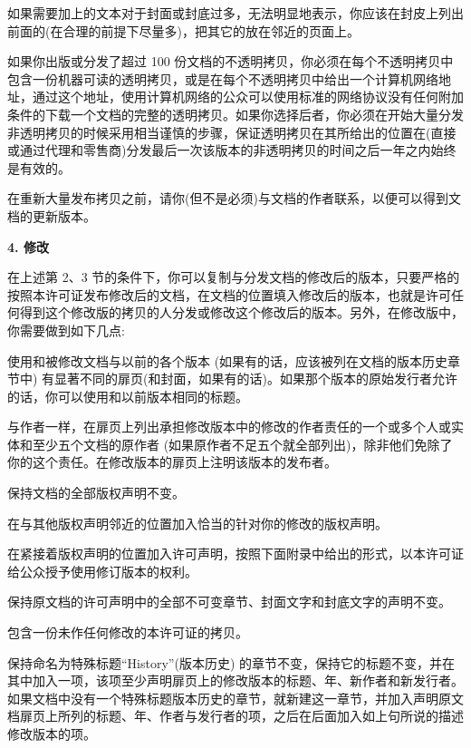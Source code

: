 如果需要加上的文本对于封面或封底过多，无法明显地表示，你应该在封皮上列出前面的(在合理的前提下尽量多)，把其它的放在邻近的页面上。

如果你出版或分发了超过 100 份文档的不透明拷贝，你必须在每个不透明拷贝中包含一份机器可读的透明拷贝，或是在每个不透明拷贝中给出一个计算机网络地址，通过这个地址，使用计算机网络的公众可以使用标准的网络协议没有任何附加条件的下载一个文档的完整的透明拷贝。如果你选择后者，你必须在开始大量分发非透明拷贝的时候采用相当谨慎的步骤，保证透明拷贝在其所给出的位置在(直接或通过代理和零售商)分发最后一次该版本的非透明拷贝的时间之后一年之内始终是有效的。

在重新大量发布拷贝之前，请你(但不是必须)与文档的作者联系，以便可以得到文档的更新版本。


\begin{center}
{\Large\bf 4. 修改\par}
\end{center}



在上述第 2、3 节的条件下，你可以复制与分发文档的修改后的版本，只要严格的按照本许可证发布修改后的文档，在文档的位置填入修改后的版本，也就是许可任何得到这个修改版的拷贝的人分发或修改这个修改后的版本。另外，在修改版中，你需要做到如下几点:

使用和被修改文档与以前的各个版本 (如果有的话，应该被列在文档的版本历史章节中) 有显著不同的扉页(和封面，如果有的话)。如果那个版本的原始发行者允许的话，你可以使用和以前版本相同的标题。 

与作者一样，在扉页上列出承担修改版本中的修改的作者责任的一个或多个人或实体和至少五个文档的原作者 (如果原作者不足五个就全部列出)，除非他们免除了你的这个责任。在修改版本的扉页上注明该版本的发布者。

保持文档的全部版权声明不变。 

在与其他版权声明邻近的位置加入恰当的针对你的修改的版权声明。 

在紧接着版权声明的位置加入许可声明，按照下面附录中给出的形式，以本许可证给公众授予使用修订版本的权利。 

保持原文档的许可声明中的全部不可变章节、封面文字和封底文字的声明不变。 

包含一份未作任何修改的本许可证的拷贝。

保持命名为特殊标题``History''(版本历史) 的章节不变，保持它的标题不变，并在其中加入一项，该项至少声明扉页上的修改版本的标题、年、新作者和新发行者。如果文档中没有一个特殊标题版本历史的章节，就新建这一章节，并加入声明原文档扉页上所列的标题、年、作者与发行者的项，之后在后面加入如上句所说的描述修改版本的项。 

